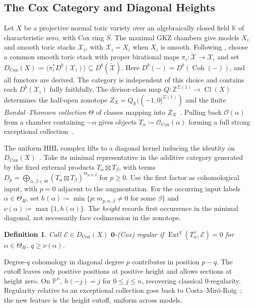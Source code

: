 \documentclass[11pt,reqno]{amsart}
\newtheorem{defn}[lemma]{Definition}
\theoremstyle{remark}
\newcommand{\Ext}{\operatorname{Ext}}
\newcommand{\Cl}{\operatorname{Cl}}
\newcommand{\Cox}{\operatorname{Cox}}
\newcommand{\zero}{\mathbf{0}}
\newcommand{\KK}{\mathbb{K}}
\newcommand{\PP}{\mathbb{P}}
\newcommand{\RR}{\mathbb{R}}
\newcommand{\ZZ}{\mathbb{Z}}
\newcommand{\cE}{\mathcal{E}}
\newcommand{\cO}{\mathcal{O}}
\newcommand{\cX}{\mathcal{X}}
\DeclareMathOperator{\Coh}{Coh}
\begin{document}
\subsection{The Cox Category and Diagonal Heights}\label{subsec:cox-diagonal}
Let $X$ be a projective normal toric variety over an algebraically closed field $\KK$ of characteristic zero, with Cox ring $S$. The maximal GKZ chambers give models $X_i$ and smooth toric stacks $\cX_i$, with $\cX_i=X_i$ when $X_i$ is smooth. Following \cite{longLiveKing}, choose a common smooth toric stack with proper birational maps $\pi_i\colon\widetilde{\cX}\to\cX_i$ and set $D_{\Cox}(X)\coloneqq\langle\pi_i^*D^b(\cX_i)\rangle\subseteq D^b(\widetilde{\cX})$. Here $D^b(-)=D^b(\Coh(-))$, and all functors are derived. The category is independent of this choice and contains each $D^b(\cX_i)$ fully faithfully. The divisor-class map $Q\colon\ZZ^{\Sigma(1)}\to\Cl(X)$ determines the half-open zonotope $Z_X=Q_{\RR}((-1,0]^{\Sigma(1)})$ and the finite \emph{Bondal--Thomsen collection} $\Theta$ of classes mapping into $Z_X$~\cite{thomsen00,bondal06}. Pulling back $\cO(\alpha)$ from a chamber containing $-\alpha$ gives objects $T_\alpha\coloneqq\cO_{\Cox}(\alpha)$ forming a full strong exceptional collection~\cite{longLiveKing}.

The uniform HHL complex lifts to a diagonal kernel inducing the identity on $D_{\Cox}(X)$~\cite[\S~6]{longLiveKing}. Take its minimal representative in the additive category generated by the fixed external products $T_\alpha\boxtimes T_\beta$, with terms $D_p=\bigoplus_{\alpha,\beta\in\Theta}(T_\alpha\boxtimes T_\beta)^{m_{p,\alpha,\beta}}$ for $p\ge0$. Use the first factor as cohomological input, with $p=0$ adjacent to the augmentation. For the occurring input labels $\alpha\in\Theta_H$, set $h(\alpha)\coloneqq\min\{p:m_{p,\alpha,\beta}\ne0\text{ for some }\beta\}$ and $\nu(\alpha)\coloneqq\max\{1,h(\alpha)\}$. The \emph{height} records first occurrence in the minimal diagonal, not necessarily face codimension in the zonotope.

\begin{defn}\label{def:cox-regularity}
Call $\cE\in D_{\Cox}(X)$ \emph{$\zero$-(Cox) regular} if $\Ext^q(T_\alpha^\vee,\cE)=0$ for $\alpha\in\Theta_H$, $q\ge\nu(\alpha)$.
\end{defn}
Degree-$q$ cohomology in diagonal degree $p$ contributes in position $p-q$. The cutoff leaves only positive positions at positive height and allows sections at height zero. On $\PP^n$, $h(-j)=j$ for $0\le j\le n$, recovering classical $0$-regularity. Regularity relative to an exceptional collection goes back to Costa--Mir\'o-Roig~\cite{costaMiroRoig07geometric,costaMRR07}; the new feature is the height cutoff, uniform across models.
\end{document}
